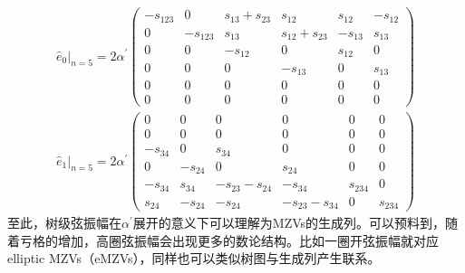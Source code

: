 \begin{equation}
	\begin{gathered}
		\hat{e}_0|_{n=5} = 2\alpha^{\prime}
		\begin{pmatrix} 
			-s_{123} & 0 & s_{13}+s_{23} & s_{12} & s_{12} & -s_{12} \\
			0 & -s_{123} & s_{13} & s_{12}+s_{23} & -s_{13} & s_{13} \\
			0 & 0 & -s_{12} & 0 & s_{12} & 0 \\
			0 & 0 & 0 & -s_{13} & 0 & s_{13} \\
			0 & 0 & 0 & 0 & 0 & 0 \\
			0 & 0 & 0 & 0 & 0 & 0
		\end{pmatrix} \\
		\hat{e}_1|_{n=5} = 2\alpha^{\prime}
		\begin{pmatrix} 
			0 & 0 & 0 & 0 & 0 & 0 \\
			0 & 0 & 0 & 0 & 0 & 0 \\
			-s_{34} & 0 & s_{34} & 0 & 0 & 0 \\
			0 & -s_{24} & 0 & s_{24} & 0 & 0 \\
			-s_{34} & s_{34} & -s_{23}-s_{24} & -s_{34} & s_{234} & 0 \\
			s_{24} & -s_{24} & -s_{24} & -s_{23}-s_{34} & 0 & s_{234}
		\end{pmatrix}
	\end{gathered}
\end{equation}
至此，树级弦振幅在$\alpha^\prime$展开的意义下可以理解为MZVs的生成列。可以预料到，随着亏格的增加，高圈弦振幅会出现更多的数论结构。比如一圈开弦振幅就对应elliptic MZVs（eMZVs）\cite{Broedel:2014vla}，同样也可以类似树图与生成列产生联系。\cite{Mafra:2019ddf}

